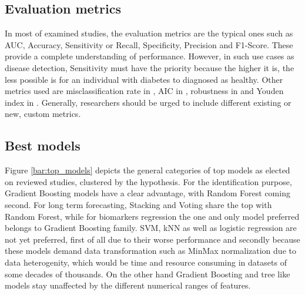 \documentclass[journal,article,submit,pdftex,moreauthors]{Definitions/mdpi}
\begin{document}
\subsection{Evaluation metrics}

In most of examined studies, the evaluation metrics are the typical ones such as AUC, Accuracy, Sensitivity or Recall, Specificity,
Precision and F1-Score. These provide a complete understanding of performance. However, in such use cases as disease detection,
Sensitivity must have the priority because the higher it is, the less possible is for an individual with diabetes to diagnosed
as healthy. Other metrics used are misclassification rate in \cite{Lai},  AIC in \cite{Qin}, robustness in
\cite{LAMA2021e07419} and Youden index in \cite{fazakis}. Generally, researchers should be urged  to include different existing or new, 
custom metrics.

\subsection{Best models}

Figure \ref{bar:top_models} depicts the general categories
of top models as elected on reviewed studies, clustered by the hypothesis. For the identification purpose, Gradient Boosting 
models have a clear advantage, with Random Forest coming second. For long term forecasting, Stacking and Voting share the top
with Random Forest, while for biomarkers regression the one and only model preferred belongs to Gradient Boosting family. SVM, kNN
as well as logistic regression are not yet preferred, first of all due to their worse performance and secondly because these 
models demand data transformation such as MinMax normalization due to data heterogenity, which would be time and resource 
consuming in datasets of some decades of thousands. On the other hand Gradient Boosting and tree like models stay 
unaffected by the different numerical ranges of features.
\end{document}
